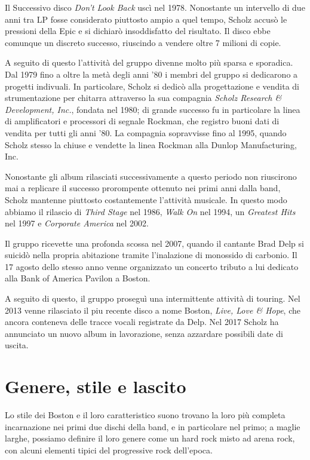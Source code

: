 \documentclass[class=book, crop=false, oneside, 12pt]{standalone}
\begin{document}
Il Successivo disco \emph{Don't Look Back} uscì nel 1978. Nonostante un intervello di due anni tra LP fosse considerato piuttosto ampio a quel tempo, Scholz accusò le pressioni della Epic e si dichiarò insoddisfatto del risultato. Il disco ebbe comunque un discreto successo, riuscindo a vendere oltre 7 milioni di copie.

A seguito di questo l'attività del gruppo divenne molto più sparsa e sporadica. Dal 1979 fino a oltre la metà degli anni '80 i membri del gruppo si dedicarono a progetti indivuali. In particolare, Scholz si dedicò alla progettazione e vendita di strumentazione per chitarra attraverso la sua compagnia \emph{Scholz Research \& Development, Inc.}, fondata nel 1980\cite{wiki:scholz_inc}; di grande successo fu in particolare la linea di amplificatori e processori di segnale Rockman, che registro buoni dati di vendita per tutti gli anni '80. La compagnia sopravvisse fino al 1995, quando Scholz stesso la chiuse e vendette la linea Rockman alla Dunlop Manufacturing, Inc\cite{wiki:scholz_inc}. 

Nonostante gli album rilasciati successivamente a questo periodo non riuscirono mai a replicare il successo prorompente ottenuto nei primi anni dalla band, Scholz mantenne piuttosto costantemente l'attività musicale. In questo modo abbiamo il rilascio di \emph{Third Stage} nel 1986, \emph{Walk On} nel 1994, un \emph{Greatest Hits} nel 1997 e \emph{Corporate America} nel 2002.

Il gruppo ricevette una profonda scossa nel 2007, quando il cantante Brad Delp si suicidò nella propria abitazione tramite l'inalazione di monossido di carbonio. Il 17 agosto dello stesso anno venne organizzato un concerto tributo a lui dedicato alla Bank of America Pavilon a Boston.

A seguito di questo, il gruppo proseguì una intermittente attività di touring. Nel 2013 venne rilasciato il piu recente disco a nome Boston, \emph{Live, Love \& Hope}, che ancora conteneva delle tracce vocali registrate da Delp. Nel 2017 Scholz ha annunciato un nuovo album in lavorazione, senza azzardare possibili date di uscita.

\section{Genere, stile e lascito}
Lo stile dei Boston e il loro caratteristico suono trovano la loro più completa incarnazione nei primi due dischi della band, e in particolare nel primo; a maglie larghe, possiamo definire il loro genere come un hard rock misto ad arena rock\cite{book:rocknamerica}, con alcuni elementi tipici del progressive rock dell'epoca.
\end{document}
